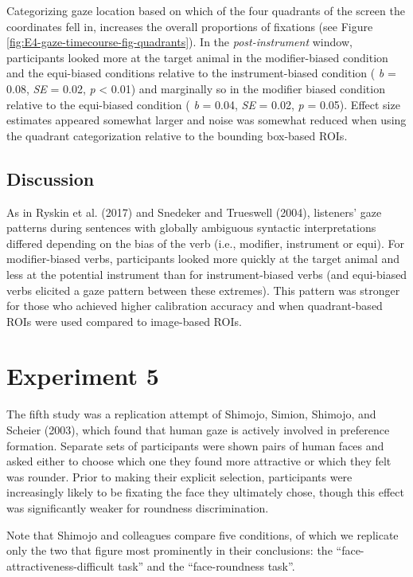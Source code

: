 \documentclass[
  man,floatsintext]{apa6}
\begin{document}
Categorizing gaze location based on which of the four quadrants of the screen the coordinates fell in, increases the overall proportions of fixations (see Figure \ref{fig:E4-gaze-timecourse-fig-quadrants}). In the \emph{post-instrument} window, participants looked more at the target animal in the modifier-biased condition and the equi-biased conditions relative to the instrument-biased condition ( \emph{b} = 0.08, \emph{SE} = 0.02, \emph{p} \textless{} 0.01) and marginally so in the modifier biased condition relative to the equi-biased condition ( \emph{b} = 0.04, \emph{SE} = 0.02, \emph{p} = 0.05). Effect size estimates appeared somewhat larger and noise was somewhat reduced when using the quadrant categorization relative to the bounding box-based ROIs.

\subsection{Discussion}\label{discussion-3}

As in Ryskin et al. (2017) and Snedeker and Trueswell (2004), listeners' gaze patterns during sentences with globally ambiguous syntactic interpretations differed depending on the bias of the verb (i.e., modifier, instrument or equi). For modifier-biased verbs, participants looked more quickly at the target animal and less at the potential instrument than for instrument-biased verbs (and equi-biased verbs elicited a gaze pattern between these extremes). This pattern was stronger for those who achieved higher calibration accuracy and when quadrant-based ROIs were used compared to image-based ROIs.

\section{Experiment 5}\label{experiment-5}

The fifth study was a replication attempt of Shimojo, Simion, Shimojo, and Scheier (2003),
which found that human gaze is actively involved in preference
formation. Separate sets of participants were shown pairs of human faces
and asked either to choose which one they found more attractive or which
they felt was rounder. Prior to making their explicit selection,
participants were increasingly likely to be fixating the face they
ultimately chose, though this effect was significantly weaker for
roundness discrimination.

Note that Shimojo and colleagues compare five conditions, of which we
replicate only the two that figure most prominently in their
conclusions: the ``face-attractiveness-difficult task'' and the
``face-roundness task''.
\end{document}
